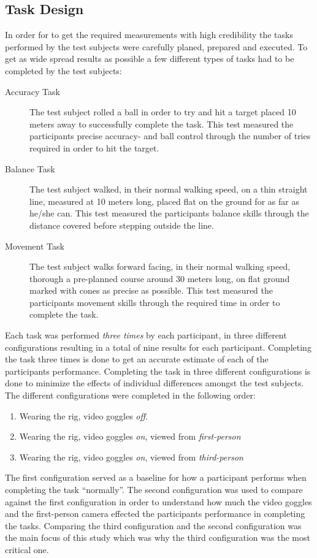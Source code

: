 \documentclass[runningheads,a4paper,oribibl]{llncs}
\begin{document}
\subsection{Task Design} \label{subsec:TaskDesign}

In order for to get the required measurements with high credibility the tasks performed by the test subjects were carefully planed, prepared and executed. To get as wide spread results as possible a few different types of tasks had to be completed by the test subjects:
\begin{description}
   \item[Accuracy Task] The test subject rolled a ball in order to try and hit a target placed 10 meters away to successfully complete the task. This test measured the participants precise accuracy- and ball control through the number of tries required in order to hit the target.
   \item[Balance Task] The test subject walked, in their normal walking speed, on a thin straight line, measured at 10 meters long, placed flat on the ground for as far as he/she can. This test measured the participants balance skills through the distance covered before stepping outside the line.
   \item[Movement Task] The test subject walks forward facing, in their normal walking speed, thorough a pre-planned course around 30 meters long, on flat ground marked with cones as precise as possible. This test measured the participants movement skills through the required time in order to complete the task.
\end{description}

Each task was performed \emph{three times} by each participant, in three different configurations resulting in a total of nine results for each participant. Completing the task three times is done to get an accurate estimate of each of the participants performance. Completing the task in three different configurations is done to minimize the effects of individual differences amongst the test subjects. The different configurations were completed in the following order:
\begin{enumerate}
	\item Wearing the rig, video goggles \emph{off}.
	\item Wearing the rig, video goggles \emph{on}, viewed from \emph{first-person}
	\item Wearing the rig, video goggles \emph{on}, viewed from \emph{third-person}
\end{enumerate}
The first configuration served as a baseline for how a participant performs when completing the task ``normally''. The second configuration was used to compare against the first configuration in order to understand how much the video goggles and the first-person camera effected the participants performance in completing the tasks. Comparing the third configuration and the second configuration was the main focus of this study which was why the third configuration was the most critical one.
\end{document}
